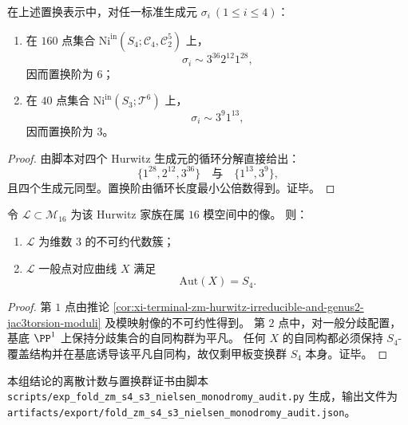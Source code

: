 \begin{proposition}\label{prop:xi-terminal-zm-hurwitz-generator-cycle-types-on-160-and-40}
在上述置换表示中，对任一标准生成元 \(\sigma_i\ (1\le i\le 4)\)：
\begin{enumerate}
  \item 在 \(160\) 点集合 \(\mathrm{Ni}^{\mathrm{in}}(S_4;\mathcal C_4,\mathcal C_2^5)\) 上，
  \[
  \sigma_i\sim 3^{36}2^{12}1^{28},
  \]
  因而置换阶为 \(6\)；
  \item 在 \(40\) 点集合 \(\mathrm{Ni}^{\mathrm{in}}(S_3;\mathcal T^6)\) 上，
  \[
  \sigma_i\sim 3^{9}1^{13},
  \]
  因而置换阶为 \(3\)。
\end{enumerate}
\end{proposition}
\begin{proof}
由脚本对四个 Hurwitz 生成元的循环分解直接给出：
\[
\{1^{28},2^{12},3^{36}\}\quad\text{与}\quad \{1^{13},3^{9}\},
\]
且四个生成元同型。置换阶由循环长度最小公倍数得到。证毕。
\end{proof}

\begin{conclusion}[模空间像的不可约性与一般点自同构群]\label{con:xi-terminal-zm-m16-locus-irreducible-generic-aut-s4}
令 \(\mathcal L\subset \mathcal M_{16}\) 为该 Hurwitz 家族在属 \(16\) 模空间中的像。
则：
\begin{enumerate}
  \item \(\mathcal L\) 为维数 \(3\) 的不可约代数簇；
  \item \(\mathcal L\) 一般点对应曲线 \(X\) 满足
  \[
  \mathrm{Aut}(X)=S_4.
  \]
\end{enumerate}
\end{conclusion}
\begin{proof}
第 \(1\) 点由推论
\ref{cor:xi-terminal-zm-hurwitz-irreducible-and-genus2-jac3torsion-moduli}
及模映射像的不可约性得到。
第 \(2\) 点中，对一般分歧配置，基底 \(\PP^1\) 上保持分歧集合的自同构群为平凡。
任何 \(X\) 的自同构都必须保持 \(S_4\)-覆盖结构并在基底诱导该平凡自同构，故仅剩甲板变换群 \(S_4\) 本身。证毕。
\end{proof}

\begin{remark}[可复现证书路径]\label{rem:xi-terminal-zm-s4-s3-nielsen-monodromy-certificate-path}
本组结论的离散计数与置换群证书由脚本
\texttt{scripts/exp\_fold\_zm\_s4\_s3\_nielsen\_monodromy\_audit.py}
生成，输出文件为
\texttt{artifacts/export/fold\_zm\_s4\_s3\_nielsen\_monodromy\_audit.json}。
\end{remark}

\endinput
